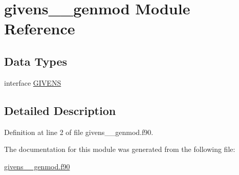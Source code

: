 \hypertarget{classgivens____genmod}{\section{givens\+\_\+\+\_\+genmod Module Reference}
\label{classgivens____genmod}
}
\subsection*{Data Types}
\begin{DoxyCompactItemize}
\item 
interface \hyperlink{interfacegivens____genmod_1_1GIVENS}{G\+I\+V\+E\+N\+S}
\end{DoxyCompactItemize}


\subsection{Detailed Description}


Definition at line 2 of file givens\+\_\+\+\_\+genmod.\+f90.



The documentation for this module was generated from the following file\+:\begin{DoxyCompactItemize}
\item 
\hyperlink{givens____genmod_8f90}{givens\+\_\+\+\_\+genmod.\+f90}\end{DoxyCompactItemize}
